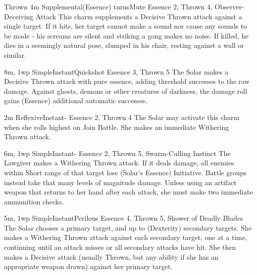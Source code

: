 \begin{Ability}{Thrown}
  {4m}
  {Supplemental}{(Essence) turns}{Mute}
  {Essence 2, Thrown 4, Observer-Deceiving Attack}
  This charm supplements a Decisive Thrown attack against a single target. If it hits, her target cannot make a sound nor cause any sounds to be made - his screams are silent and striking a gong makes no noise. If killed, he dies in a seemingly natural pose, slumped in his chair, resting against a wall or similar.

  {8m, 1wp}
  {Simple}{Instant}{Quickshot}
  {Essence 3, Thrown 5}
  The Solar makes a Decisive Thrown attack with pure essence, adding threshold successes to the raw damage. Against ghosts, demons or other creatures of darkness, the damage roll gains (Essence) additional automatic successes.

  {2m}
  {Reflexive}{Instant}{-}
  {Essence 2, Thrown 4}
  The Solar may activate this charm when she rolls highest on Join Battle. She makes an immediate Withering Thrown attack.

  {6m, 1wp}
  {Simple}{Instant}{-}
  {Essence 2, Thrown 5, Swarm-Culling Instinct}
  The Lawgiver makes a Withering Thrown attack. If it deals damage, all enemies within Short range of that target lose (Solar's Essence) Initiative. Battle groups instead take that many levels of magnitude damage. Unless using an artifact weapon that returns to her hand after each attack, she must make two immediate ammunition checks.

  {5m, 1wp}
  {Simple}{Instant}{Perilous}
  {Essence 4, Thrown 5, Shower of Deadly Blades}
  The Solar chooses a primary target, and up to (Dexterity) secondary targets. She makes a Withering Thrown attack against each secondary target, one at a time, continuing until an attack misses or all secondary attacks have hit. She then makes a Decisive attack (usually Thrown, but any ability if she has an appropriate weapon drawn) against her primary target.

\end{Ability}

